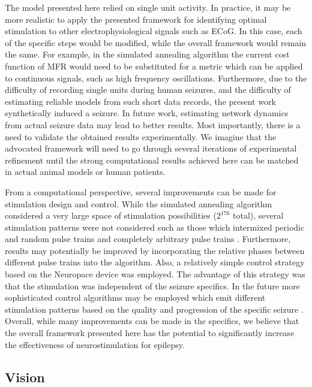 \documentclass[11pt,a4paper,final]{article}
\begin{document}
The model presented here relied on single unit activity.
In practice, it may be more realistic to apply the presented framework for identifying optimal stimulation to other electrophysiological signals such as ECoG.
In this case, each of the specific steps would be modified, while the overall framework would remain the same.
For example, in the simulated annealing algorithm the current cost function of MFR would need to be substituted for a metric which can be applied to continuous signals, such as high frequency oscillations.
Furthermore, due to the difficulty of recording single units during human seizures, and the difficulty of estimating reliable models from such short data records, the present work synthetically induced a seizure.
In future work, estimating network dynamics from actual seizure data may lead to better results.
Most importantly, there is a need to validate the obtained results experimentally.
We imagine that the advocated framework will need to go through several iterations of experimental refinement until the strong computational results achieved here can be matched in actual animal models or human patients.

From a computational perspective, several improvements can be made for stimulation design and control.
While the simulated annealing algorithm considered a very large space of stimulation possibilities ($2^{176}$ total), several stimulation patterns were not considered such as those which intermixed periodic and random pulse trains and completely arbitrary pulse trains \citep{grill14patent2,brocker17}.
Furthermore, results may potentially be improved by incorporating the relative phases between different pulse trains into the algorithm.
Also, a relatively simple control strategy based on the Neuropace device was employed.
The advantage of this strategy was that the stimulation was independent of the seizure specifics.
In the future more sophisticated control algorithms may be employed which emit different stimulation patterns based on the quality and progression of the specific seizure \citep{ching12,zalay13,kalitzin14,ehrens15}.
Overall, while many improvements can be made in the specifics, we believe that the overall framework presented here has the potential to significantly increase the effectiveness of neurostimulation for epilepsy.

\subsection{Vision}
\end{document}
